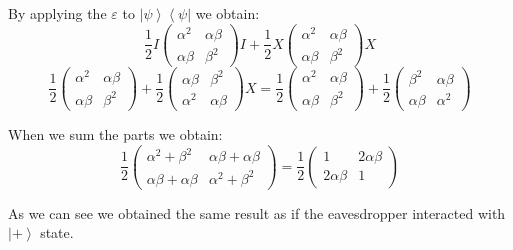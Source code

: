 \documentclass[a4paper,10pt]{article}
\newcommand{\bra}[1]{\ensuremath{\left\langle#1\right|}} %
\newcommand{\ket}[1]{\ensuremath{\left|#1\right\rangle}} %
\newcommand{\ap}{\ensuremath{\frac{1}{2}}}
\begin{document}
\begin{enumerate}[1.]
By applying the $\varepsilon$ to \ket{\psi}\bra{\psi} we obtain:
$$
\ap I \left(
\begin{array}{cc}
\alpha^2 & \alpha\beta \\
\alpha\beta & \beta^2
\end{array}
\right) I +
\ap X
\left(
\begin{array}{cc}
\alpha^2 & \alpha\beta \\
\alpha\beta & \beta^2
\end{array}
\right)
X
$$
$$
\ap \left(
\begin{array}{cc}
\alpha^2 & \alpha\beta \\
\alpha\beta & \beta^2
\end{array}
\right)+
\ap
\left(
\begin{array}{cc}
\alpha\beta & \beta^2\\
\alpha^2 & \alpha\beta
\end{array}
\right)
X
=
\ap \left(
\begin{array}{cc}
\alpha^2 & \alpha\beta \\
\alpha\beta & \beta^2
\end{array}
\right)+
\ap
\left(
\begin{array}{cc}
\beta^2 & \alpha\beta \\
\alpha\beta & \alpha^2 
\end{array}
\right)
$$

When we sum the parts we obtain:
$$
\ap \left(
\begin{array}{cc}
\alpha^2 + \beta^2 & \alpha\beta + \alpha\beta\\
\alpha\beta + \alpha\beta & \alpha^2 + \beta^2 
\end{array}
\right)
=
\ap \left(
\begin{array}{cc}
1 & 2\alpha\beta\\
2\alpha\beta & 1
\end{array}
\right)
$$

As we can see we obtained the same result as if the eavesdropper interacted with \ket{+} state.
\end{enumerate}
\end{document}
